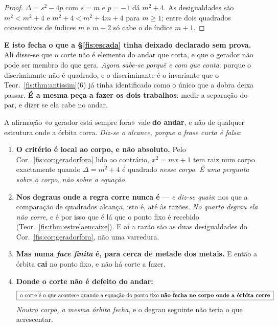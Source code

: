 \documentclass[livro.tex]{subfiles}
\begin{document}
\begin{proof}
$\Delta=s^{2}-4p$ com $s=m$ e $p=-1$ dá $m^{2}+4$. As desigualdades são
$m^{2}<m^{2}+4$ e $m^{2}+4<m^{2}+4m+4$ para $m\ge1$; entre dois quadrados
consecutivos de índices $m$ e $m+2$ só cabe o de índice $m+1$.
\end{proof}


\medskip\noindent\textbf{E isto fecha o que a §\ref{fis:escada} tinha deixado
declarado sem prova.} Ali disse-se que o corte não é elemento do andar que corta,
e que o gerador não pode ser membro do que gera. \emph{Agora sabe-se \emph{porquê}
e com que conta}: porque o discriminante não é quadrado, e o discriminante é o
invariante que o Teor.~\ref{fis:thm:antissim}(6) já tinha identificado como o
único que a dobra deixa passar. \textbf{É a mesma peça a fazer os dois
trabalhos}: medir a separação do par, e dizer se ela cabe no andar.

\begin{corolario}\label{fis:cor:corpofinito}
A afirmação «o gerador está sempre fora» vale \textbf{do andar}, e não de qualquer
estrutura onde a órbita corra. \emph{Diz-se o alcance, porque a frase curta é
falsa}:
\begin{enumerate}\itemsep3pt
\item[(1)] \textbf{O critério é local ao corpo, e não absoluto.} Pelo
Cor.~\ref{fis:cor:geradorfora} lido ao contrário, $x^{2}=mx+1$ tem raiz num corpo
exactamente quando $\Delta=m^{2}+4$ é quadrado \emph{nesse corpo}. \emph{É uma
pergunta sobre o corpo, não sobre a equação.}
\item[(2)] \textbf{Nos degraus onde a regra corre nunca é} --- \emph{e diz-se
quais}: nos que a comparação de quadrados alcança, isto é, até às razões. \emph{No
quarto degrau ela não corre}, e é por isso que é lá que o ponto fixo é recebido
(Teor.~\ref{fis:thm:estrelaencaixe}). E aí a razão são as duas
desigualdades do Cor.~\ref{fis:cor:geradorfora}, não uma varredura.
\item[(3)] \textbf{Mas numa \emph{face finita} é, para cerca de metade dos
metais.} E então a órbita \textbf{cai} no ponto fixo, e não há corte a fazer.
\item[(4)] \textbf{Donde o corte não é defeito do andar:}
\[
\boxed{\;\text{o corte é o que acontece quando a equação do ponto fixo \textbf{não fecha no corpo onde a órbita corre}}\;}
\]
\emph{Noutro corpo, a mesma órbita fecha}, e o degrau seguinte não teria o que
acrescentar.
\end{enumerate}
\end{corolario}
\end{document}
